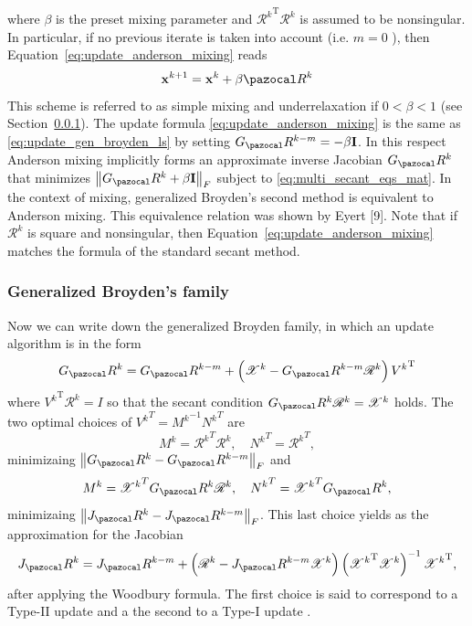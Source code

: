 where \(\beta\) is the preset mixing parameter and \({\mathscr{R}^{k}}^{\mathrm{T}} \mathscr{R}^{k}\) is assumed to be nonsingular.
In particular, if no previous iterate is taken into account (i.e. \(m=0\) ), then Equation~\eqref{eq:update_anderson_mixing} reads
\begin{equation}
  \mathbf x^{k+1}=\mathbf x^{k}+\beta \pazocal R^{k}
\end{equation}
This scheme is referred to as simple mixing and underrelaxation if \(0<\beta<1\) (see Section~\ref{}).
The update formula \eqref{eq:update_anderson_mixing} is the same as \eqref{eq:update_gen_broyden_ls} by setting \(G_\pazocal R^{k-m}=-\beta \mathbf I\).
In this respect Anderson mixing implicitly forms an approximate inverse Jacobian \(G_\pazocal R^{k}\) that minimizes \(\left\|G_\pazocal R^{k}+\beta \mathbf I\right\|_{F}\) subject to \eqref{eq:multi_secant_eqs_mat}.
In the context of mixing, generalized Broyden's second method is equivalent to Anderson mixing. This equivalence relation was shown by Eyert [9].
Note that if \(\mathscr{R}^{k}\) is square and nonsingular, then Equation~\eqref{eq:update_anderson_mixing} matches the formula of the standard secant method.

\subsubsection{Generalized Broyden's family}

Now we can write down the generalized Broyden family, in which an update algorithm is in the form
\begin{equation} \label{eq:inv_jacob_gen_broyden}
G_\pazocal R^{k}=G_\pazocal R^{k-m}+\left(\mathscr{X}^{k}-G_\pazocal R^{k-m} \mathscr{R}^{k}\right) {V^{k}}^{\mathrm{T}}
\end{equation}
where \({V^{k}}^{\mathrm{T}} \mathscr{R}^{k}=I\) so that the secant condition \(G_\pazocal R^{k} \mathscr{R}^{k}=\mathscr{X}^{k}\) holds.
The two optimal choices of \({V^k}^T = {M^k}^{-1}{N^k}^T\) are
\begin{equation}
  {M^k} = {\mathscr R^k}^T \mathscr R^k,\quad {N^k}^T = {\mathscr R^k}^T,
\end{equation}
minimizaing \(\left\|G_\pazocal R^k - G_\pazocal R^{k-m}\right\|_F\) and
\begin{equation}
  {M^k} = {\mathscr X^k}^T G_\pazocal R^k \mathscr R^k,\quad {N^k}^T = {\mathscr X^k}^T G_\pazocal R^k,
\end{equation}
minimizaing \(\left\|J_\pazocal R^k - J_\pazocal R^{k-m}\right\|_F\).
This last choice yields as the approximation for the Jacobian
\begin{equation}
  J_\pazocal R^{k}=J_\pazocal R^{k-m}+\left(\mathscr{R}^{k}-J_\pazocal R^{k-m} \mathscr{X}^{k}\right)\left({\mathscr{X}^{k}}^{\mathrm{T}} \mathscr{X}^{k}\right)^{-1} {\mathscr{X}^{k}}^{\mathrm{T}},
\end{equation}
after applying the Woodbury formula.
The first choice is said to correspond to a Type-II update and a the second to a Type-I update \citep{fang_two_2009}.
%
